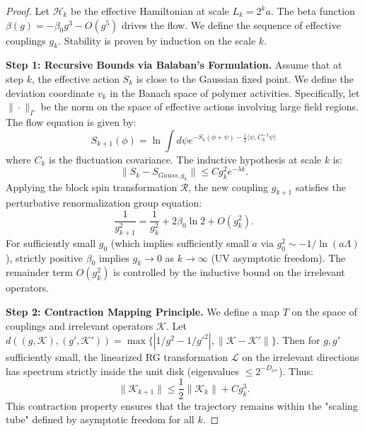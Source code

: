 \begin{proof}
Let $\mathcal{H}_k$ be the effective Hamiltonian at scale $L_k = 2^k a$.
The beta function $\beta(g) = - \beta_0 g^3 - O(g^5)$ drives the flow.
We define the sequence of effective couplings $g_k$. Stability is proven by induction on the scale $k$.

\textbf{Step 1: Recursive Bounds via Balaban's Formulation.}
Assume that at step $k$, the effective action $S_k$ is close to the Gaussian fixed point. We define the deviation coordinate $v_k$ in the Banach space of polymer activities.
Specifically, let $\| \cdot \|_{\Gamma}$ be the norm on the space of effective actions involving large field regions.
The flow equation is given by:
\begin{equation}
S_{k+1}(\phi) = \ln \int d\psi e^{-S_k(\phi + \psi) - \frac{1}{2} \langle \psi, C_k^{-1} \psi \rangle}
\end{equation}
where $C_k$ is the fluctuation covariance.
The inductive hypothesis at scale $k$ is:
\begin{equation}
\| S_k - S_{Gauss, g_k} \| \le C g_k^2 e^{-\lambda k}.
\end{equation}
Applying the block spin transformation $\mathcal{R}$, the new coupling $g_{k+1}$ satisfies the perturbative renormalization group equation:
\begin{equation}
\frac{1}{g_{k+1}^2} = \frac{1}{g_k^2} + 2\beta_0 \ln 2 + O(g_k^2).
\end{equation}
For sufficiently small $g_0$ (which implies sufficiently small $a$ via $g_0^2 \sim -1/\ln(a\Lambda)$), strictly positive $\beta_0$ implies $g_k \to 0$ as $k \to \infty$ (UV asymptotic freedom). The remainder term $O(g_k^2)$ is controlled by the inductive bound on the irrelevant operators.

\textbf{Step 2: Contraction Mapping Principle.}
We define a map $T$ on the space of couplings and irrelevant operators $\mathcal{K}$.
Let $d((g, \mathcal{K}), (g', \mathcal{K}')) = \max \{ |1/g^2 - 1/g'^2|, \|\mathcal{K} - \mathcal{K}'\| \}$.
Then for $g, g'$ sufficiently small, the linearized RG transformation $\mathcal{L}$ on the irrelevant directions has spectrum strictly inside the unit disk (eigenvalues $\le 2^{-D_{irr}}$).
Thus:
\begin{equation}
\|\mathcal{K}_{k+1}\| \le \frac{1}{2} \|\mathcal{K}_k\| + C g_k^3.
\end{equation}
This contraction property ensures that the trajectory remains within the "scaling tube" defined by asymptotic freedom for all $k$.


\end{proof}
